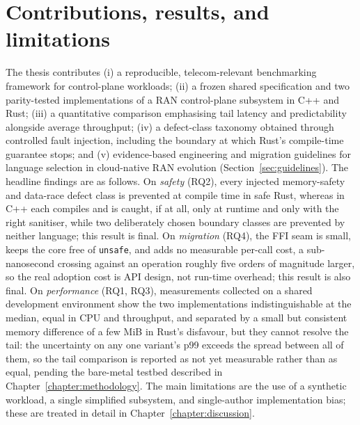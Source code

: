 \documentclass[english,twoside,openright,a4paper,censored,csm,software-track-2020]{HYthesisML}
\begin{document}
\section{Contributions, results, and limitations}
The thesis contributes (i) a reproducible, telecom-relevant benchmarking framework for
control-plane workloads; (ii) a frozen shared specification and two parity-tested
implementations of a RAN control-plane subsystem in C++ and Rust; (iii) a quantitative
comparison emphasising tail latency and predictability alongside average throughput;
(iv) a defect-class taxonomy obtained through controlled fault injection, including the
boundary at which Rust's compile-time guarantee stops; and (v) evidence-based engineering and
migration guidelines for language selection in cloud-native RAN evolution
(Section~\ref{sec:guidelines}). The headline findings are as follows. On \emph{safety} (RQ2),
every injected memory-safety and data-race defect class is prevented at compile time in safe
Rust, whereas in C++ each compiles and is caught, if at all, only at runtime and only with the
right sanitiser, while two deliberately chosen boundary classes are prevented by neither
language; this result is final. On \emph{migration} (RQ4), the FFI seam is small, keeps the core free of
\texttt{unsafe}, and adds no measurable per-call cost, a sub-nanosecond crossing against an
operation roughly five orders of magnitude larger, so the real adoption cost is API design,
not run-time overhead; this result is also final. On \emph{performance} (RQ1, RQ3), measurements
collected on a shared development environment show the two implementations indistinguishable at
the median, equal in CPU and throughput, and separated by a small but consistent memory
difference of a few MiB in Rust's disfavour, but they cannot resolve the tail: the uncertainty
on any one variant's p99 exceeds the spread between all of them, so the tail comparison is
reported as not yet measurable rather than as equal, pending the bare-metal testbed described
in Chapter~\ref{chapter:methodology}. The main
limitations are the use of a synthetic workload, a single simplified subsystem, and
single-author implementation bias; these are treated in detail in
Chapter~\ref{chapter:discussion}.
\end{document}
